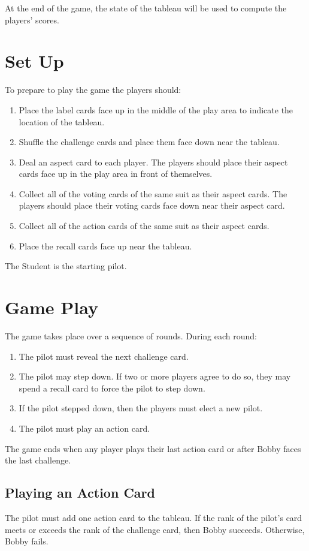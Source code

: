 \documentclass[a4paper, 10pt,notumble]{leaflet}
\begin{document}
\bigskip
At the end of the game, the state of the tableau will be used to compute the players' scores.

\section{Set Up}
To prepare to play the game the players should:
\begin{enumerate}
\item Place the label cards face up in the middle of the play area to indicate the location of the tableau.
\item Shuffle the challenge cards and place them face down near the tableau.
\item Deal an aspect card to each player. The players should place their aspect cards face up in the play area in front of themselves.
\item Collect all of the voting cards of the same suit as their aspect cards. The players should place their voting cards face down near their aspect card.
\item Collect all of the action cards of the same suit as their aspect cards.
\item Place the recall cards face up near the tableau. 
\end{enumerate}
The Student is the starting pilot.

\newpage

\section{Game Play}
The game takes place over a sequence of rounds.
During each round:
\begin{enumerate}
	\item The pilot must reveal the next challenge card. 
	\item The pilot may step down. If two or more players agree to do so, they may spend a recall card to force the pilot to step down.
	\item If the pilot stepped down, then the players must elect a new pilot.
	\item The pilot must play an action card. 
\end{enumerate}
The game ends when any player plays their last action card or after Bobby faces the last challenge.

\subsection{Playing an Action Card}
The pilot must add one action card to the tableau.
If the rank of the pilot's card meets or exceeds the rank of the challenge card, then Bobby succeeds. Otherwise, Bobby fails.
\end{document}
